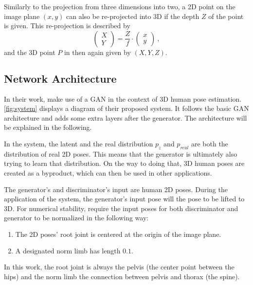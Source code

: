 Similarly to the projection from three dimensions into two, a 2D point on the image plane $(x, y)$ can also be re-projected into 3D if the depth $Z$ of the point is given.
This re-projection is described by
\begin{equation}
	\label{eq:perspective-re-projection}
	\begin{pmatrix}
	X\\
	Y
	\end{pmatrix} = \frac{Z}{f} \cdot
	\begin{pmatrix}
	x\\
	y
	\end{pmatrix} \ ,
\end{equation}
and the 3D point $P$ in then again given by $(X, Y, Z)$.

\subsection{Network Architecture}
\label{sec:network-architecture}



In their work, \citet{drover18} make use of a GAN in the context of 3D human pose estimation.
\autoref{fig:system} displays a diagram of their proposed system.
It follows the basic GAN architecture and adds some extra layers after the generator.
The architecture will be explained in the following.

In the system, the latent and the real distribution $p_z$ and $p_{real}$ are both the distribution of real 2D poses.
This means that the generator is ultimately also trying to learn that distribution.
On the way to doing that, 3D human poses are created as a byproduct, which can then be used in other applications.

The generator's and discriminator's input are human 2D poses.
During the application of the system, the generator's input pose will the pose to be lifted to 3D.
For numerical stability, \citet{drover18} require the input poses for both discriminator and generator to be normalized in the following way:
\begin{enumerate}[label=(\Alph*)]
	\item The 2D poses' root joint is centered at the origin of the image plane.
	\item A designated norm limb has length $0.1$.
\end{enumerate}
In this work, the root joint is always the pelvis (the center point between the hips) and the norm limb the connection between pelvis and thorax (the spine).

